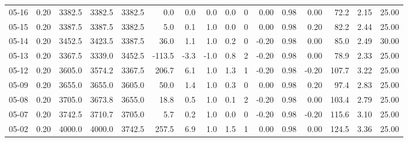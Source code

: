 \begin{threeparttable}
{\begin{tabular}{lrrrrrrrrrrrrrrr}
  05-16 &     0.20 & 3382.5 & 3382.5 & 3382.5 &        0.0 &            0.0 &                      0.0 &                 0.0 &              0 &       0.00 &      0.98 &           0.00 &             72.2 &            2.15 &                  25.00 \\
  05-15 &     0.20 & 3387.5 & 3387.5 & 3382.5 &        5.0 &            0.1 &                      1.0 &                 0.0 &              0 &       0.00 &      0.98 &           0.20 &             82.2 &            2.44 &                  25.00 \\
  05-14 &     0.20 & 3452.5 & 3423.5 & 3387.5 &       36.0 &            1.1 &                      1.0 &                 0.2 &              0 &      -0.20 &      0.98 &           0.00 &             85.0 &            2.49 &                  30.00 \\
  05-13 &     0.20 & 3367.5 & 3339.0 & 3452.5 &     -113.5 &           -3.3 &                     -1.0 &                 0.8 &              2 &      -0.20 &      0.98 &           0.00 &             78.9 &            2.33 &                  25.00 \\
  05-12 &     0.20 & 3605.0 & 3574.2 & 3367.5 &      206.7 &            6.1 &                      1.0 &                 1.3 &              1 &      -0.20 &      0.98 &          -0.20 &            107.7 &            3.22 &                  25.00 \\
  05-09 &     0.20 & 3655.0 & 3655.0 & 3605.0 &       50.0 &            1.4 &                      1.0 &                 0.3 &              0 &       0.00 &      0.98 &           0.20 &             97.4 &            2.83 &                  25.00 \\
  05-08 &     0.20 & 3705.0 & 3673.8 & 3655.0 &       18.8 &            0.5 &                      1.0 &                 0.1 &              2 &      -0.20 &      0.98 &           0.00 &            103.4 &            2.79 &                  25.00 \\
  05-07 &     0.20 & 3742.5 & 3710.7 & 3705.0 &        5.7 &            0.2 &                      1.0 &                 0.0 &              0 &      -0.20 &      0.98 &          -0.20 &            115.6 &            3.10 &                  25.00 \\
  05-02 &     0.20 & 4000.0 & 4000.0 & 3742.5 &      257.5 &            6.9 &                      1.0 &                 1.5 &              1 &       0.00 &      0.98 &           0.00 &            124.5 &            3.36 &                  25.00 \\

\end{tabular}}
\end{threeparttable}
